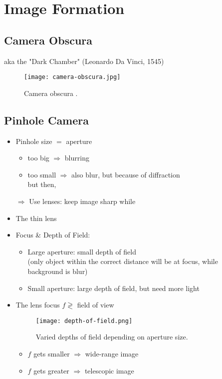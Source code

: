 \chapter{Image Formation}
\label{cha:image-formation}

\section{Camera Obscura}
\ac{aka} the "Dark Chamber" (Leonardo Da Vinci, 1545)
\begin{figure}[hbt!]
	\centering
	\texttt{[image: camera-obscura.jpg]}
	\caption{Camera obscura \cite{frisiusradio}.}
\end{figure}

\section{Pinhole Camera}
\begin{itemize}
	\item Pinhole size $=$ aperture
	\begin{itemize}
		\item too big $\Rightarrow$ blurring
		\item too small $\Rightarrow$ also blur, but because of diffraction\\ but then, 
	\end{itemize}
	$\Rightarrow$ Use lenses: keep image sharp while 
	\item The thin lens
	\item Focus \& Depth of Field:
	\begin{itemize}
		\item Large aperture: small depth of field\\
		(only object within the correct distance will be at focus, while background is blur)
		\item Small aperture: large depth of field, but need more light
	\end{itemize}
	\item The lens focus $f \gtrless$ field of view
	\begin{figure}[hbt!]
		\centering
		\texttt{[image: depth-of-field.png]}
		\caption{Varied depths of field depending on aperture size.}
	\end{figure}
	\begin{itemize}
		\item $f$ gets smaller $\Rightarrow$ wide-range image
		\item $f$ gets greater $\Rightarrow$ telescopic image
	\end{itemize}
\end{itemize}

